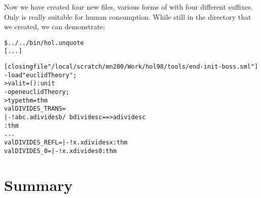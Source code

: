 Now we have created four new files, various forms of 
with four different suffixes.  Only  is really
suitable for human consumption.  While still in the 
directory that we created, we can demonstrate:

\begin{session}
\begin{alltt}
\$ ../../bin/hol.unquote
[...]

[closing file "/local/scratch/mn200/Work/hol98/tools/end-init-boss.sml"]
- load "euclidTheory";
> val it = () : unit
- open euclidTheory;
> type thm = thm
  val DIVIDES_TRANS =
    |- !a b c. a divides b /\ b divides c ==> a divides c
    : thm
  ...
  val DIVIDES_REFL = |- !x. x divides x : thm
  val DIVIDES_0 = |- !x. x divides 0 : thm
\end{alltt}
\end{session}

\section{Summary}

